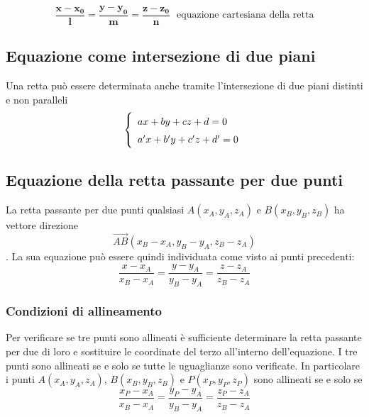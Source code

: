 \documentclass{article}     %
\begin{document}
            \[\mathbf{\dfrac{x-x_0}{l}=\dfrac{y-y_0}{m}=\dfrac{z-z_0}{n}}~~~\text{equazione cartesiana della retta}\]
        \subsection{Equazione come intersezione di due piani}
            Una retta può essere determinata anche tramite l'intersezione di due piani distinti e non paralleli
            \[\left\{\renewcommand{\arraystretch}{1.5}\begin{array}{l}
                ax+by+cz+d=0\\
                a'x+b'y+c'z+d'=0
            \end{array}\right.\]
        \subsection{Equazione della retta passante per due punti}
            La retta passante per due punti qualsiasi $A(x_A,y_A,z_A)$ e $B(x_B,y_B,z_B)$ ha vettore direzione \[\overrightarrow{AB}(x_B-x_A, y_B-y_A, z_B-z_A)\]. La sua equazione può essere quindi individuata come visto ai punti precedenti:
            \[\frac{x-x_A}{x_B-x_A}=\frac{y-y_A}{y_B-y_A}=\frac{z-z_A}{z_B-z_A}\]
            \subsubsection{Condizioni di allineamento}
                Per verificare se tre punti sono allineati è sufficiente determinare la retta passante per due di loro e sostituire le coordinate del terzo all'interno dell'equazione. I tre punti sono allineati se e solo se tutte le uguaglianze sono verificate. In particolare i punti $A(x_A,y_A,z_A)$, $B(x_B,y_B,z_B)$ e $P(x_P,y_P,z_P)$ sono allineati se e solo se \[\frac{x_P-x_A}{x_B-x_A}=\frac{y_P-y_A}{y_B-y_A}=\frac{z_P-z_A}{z_B-z_A}\]
\end{document}
